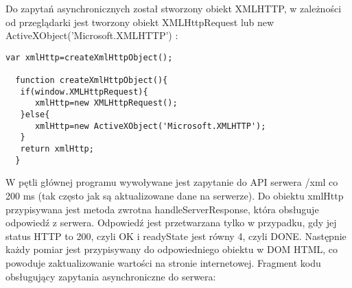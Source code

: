 \documentclass[a4paper,12pt,twoside,openany]{report}
\begin{document}
Do zapytań asynchronicznych został stworzony obiekt XMLHTTP, w zależności od przeglądarki jest tworzony obiekt XMLHttpRequest lub new ActiveXObject('Microsoft.XMLHTTP') \cite{xmlhttp,microsoftxmlhttp}:
\begin{lstlisting}[style=customhtml]
  var xmlHttp=createXmlHttpObject();
  
  function createXmlHttpObject(){
   if(window.XMLHttpRequest){
      xmlHttp=new XMLHttpRequest();
   }else{
      xmlHttp=new ActiveXObject('Microsoft.XMLHTTP');
   }
   return xmlHttp;
  }
\end{lstlisting}
W pętli głównej programu wywoływane jest zapytanie do API serwera /xml co 200 ms (tak często jak są aktualizowane dane na serwerze). Do obiektu xmlHttp przypisywana jest metoda zwrotna handleServerResponse, która obsługuje odpowiedź z serwera. Odpowiedź jest przetwarzana tylko w przypadku, gdy jej status HTTP to 200, czyli OK i readyState jest równy 4, czyli DONE. Następnie każdy pomiar jest przypisywany do odpowiedniego obiektu w DOM HTML, co powoduje zaktualizowanie wartości na stronie internetowej. Fragment kodu obsługujący zapytania asynchroniczne do serwera:
\end{document}
